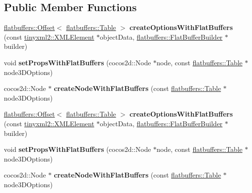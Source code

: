 \subsection*{Public Member Functions}
\begin{DoxyCompactItemize}
\item 
\mbox{\label{classcocostudio_1_1Node3DReader_a8cdaab602f1ee230ffd3cee0267fcb2a}} 
\hyperlink{structflatbuffers_1_1Offset}{flatbuffers\+::\+Offset}$<$ \hyperlink{classflatbuffers_1_1Table}{flatbuffers\+::\+Table} $>$ {\bfseries create\+Options\+With\+Flat\+Buffers} (const \hyperlink{classtinyxml2_1_1XMLElement}{tinyxml2\+::\+X\+M\+L\+Element} $\ast$object\+Data, \hyperlink{classflatbuffers_1_1FlatBufferBuilder}{flatbuffers\+::\+Flat\+Buffer\+Builder} $\ast$builder)
\item 
\mbox{\label{classcocostudio_1_1Node3DReader_ac40fc9c68ce06a374fe34ef0da4a8eaa}} 
void {\bfseries set\+Props\+With\+Flat\+Buffers} (cocos2d\+::\+Node $\ast$node, const \hyperlink{classflatbuffers_1_1Table}{flatbuffers\+::\+Table} $\ast$node3\+D\+Options)
\item 
\mbox{\label{classcocostudio_1_1Node3DReader_a181748d17a21b819c60551eb679f0527}} 
cocos2d\+::\+Node $\ast$ {\bfseries create\+Node\+With\+Flat\+Buffers} (const \hyperlink{classflatbuffers_1_1Table}{flatbuffers\+::\+Table} $\ast$node3\+D\+Options)
\item 
\mbox{\label{classcocostudio_1_1Node3DReader_a0e46890e0c173efd7c52e51625f3f914}} 
\hyperlink{structflatbuffers_1_1Offset}{flatbuffers\+::\+Offset}$<$ \hyperlink{classflatbuffers_1_1Table}{flatbuffers\+::\+Table} $>$ {\bfseries create\+Options\+With\+Flat\+Buffers} (const \hyperlink{classtinyxml2_1_1XMLElement}{tinyxml2\+::\+X\+M\+L\+Element} $\ast$object\+Data, \hyperlink{classflatbuffers_1_1FlatBufferBuilder}{flatbuffers\+::\+Flat\+Buffer\+Builder} $\ast$builder)
\item 
\mbox{\label{classcocostudio_1_1Node3DReader_ac40fc9c68ce06a374fe34ef0da4a8eaa}} 
void {\bfseries set\+Props\+With\+Flat\+Buffers} (cocos2d\+::\+Node $\ast$node, const \hyperlink{classflatbuffers_1_1Table}{flatbuffers\+::\+Table} $\ast$node3\+D\+Options)
\item 
\mbox{\label{classcocostudio_1_1Node3DReader_ae231650df554492aec25355089e8d77b}} 
cocos2d\+::\+Node $\ast$ {\bfseries create\+Node\+With\+Flat\+Buffers} (const \hyperlink{classflatbuffers_1_1Table}{flatbuffers\+::\+Table} $\ast$node3\+D\+Options)
\end{DoxyCompactItemize}
